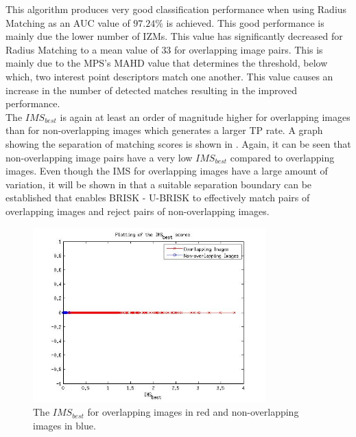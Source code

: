 \documentclass[11pt]{report}
\begin{document}

This algorithm produces very good classification performance when using Radius Matching as an AUC value of $97.24\%$ is achieved. This good performance is mainly due the lower number of IZMs. This value has significantly decreased for Radius Matching to a mean value of $33$ for overlapping image pairs. This is mainly due to the MPS's MAHD value that determines the threshold, below which, two interest point descriptors match one another. This value causes an increase in the number of detected matches resulting in the improved performance.\\

The $IMS_{best}$ is again at least an order of magnitude higher for overlapping images than for non-overlapping images which generates a larger TP rate. A graph showing the separation of matching scores is shown in . Again, it can be seen that non-overlapping image pairs have a very low $IMS_{best}$ compared to overlapping images. Even though the IMS for overlapping images have a large amount of variation, it will be shown in  that a suitable separation boundary can be established that enables BRISK - U-BRISK to effectively match pairs of overlapping images and reject pairs of non-overlapping images.\\

\begin{figure}
  \centering
    \includegraphics[width=0.8\textwidth]{../Drawings/Matching/MatchingScore_BRISK0UBRISK.jpg}
    \caption{The $IMS_{best}$ for overlapping images in red and non-overlapping images in blue.} 
    \label{fig:ms_ubrisk}
\end{figure}
\end{document}
